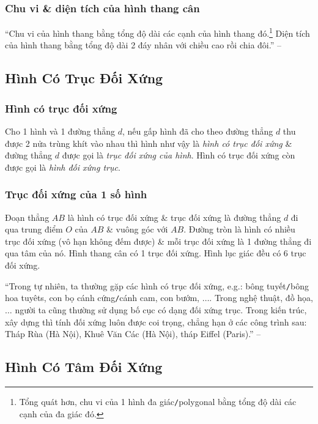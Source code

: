 \documentclass{article}
\numberwithin{equation}{section}
\begin{document}
\subsubsection{Chu vi \& diện tích của hình thang cân}
``Chu vi của hình thang bằng tổng độ dài các cạnh của hình thang đó.\footnote{Tổng quát hơn, chu vi của 1 hình đa giác\texttt{/}polygonal bằng tổng độ dài các cạnh của đa giác đó.} Diện tích của hình thang bằng tổng độ dài 2 đáy nhân với chiều cao rồi chia đôi.'' -- \cite[p. 106]{Thai_Anh_Dat_Ha_Loan_Nam_Quang_Toan_6_tap_1}

\subsection{Hình Có Trục Đối Xứng}

\subsubsection{Hình có trục đối xứng}
Cho 1 hình và 1 đường thẳng $d$, nếu gấp hình đã cho theo đường thẳng $d$ thu được 2 nửa trùng khít vào nhau thì hình như vậy là \textit{hình có trục đối xứng} \& đường thẳng $d$ được gọi là \textit{trục đối xứng của hình}. Hình có trục đối xứng còn được gọi là \textit{hình đối xứng trục}.

\subsubsection{Trục đối xứng của 1 số hình}
Đoạn thẳng $AB$ là hình có trục đối xứng \& trục đối xứng là đường thẳng $d$ đi qua trung điểm $O$ của $AB$ \& vuông góc với $AB$. Đường tròn là hình có nhiều trục đối xứng (vô hạn không đếm được) \& mỗi trục đối xứng là 1 đường thẳng đi qua tâm của nó. Hình thang cân có 1 trục đối xứng. Hình lục giác đều có 6 trục đối xứng.

``Trong tự nhiên, ta thường gặp các hình có trục đối xứng, e.g.: bông tuyết\texttt{/}bông hoa tuyêts, con bọ cánh cứng\texttt{/}cánh cam, con bướm, $\ldots$. Trong nghệ thuật, đồ họa, $\ldots$ người ta cũng thường sử dụng bố cục có dạng đối xứng trục. Trong kiến trúc, xây dựng thì tính đối xứng luôn được coi trọng, chẳng hạn ở các công trình sau: Tháp Rùa (Hà Nội), Khuê Văn Các (Hà Nội), tháp Eiffel (Paris).'' -- \cite[p. 110]{Thai_Anh_Dat_Ha_Loan_Nam_Quang_Toan_6_tap_1}

\subsection{Hình Có Tâm Đối Xứng}
\end{document}
